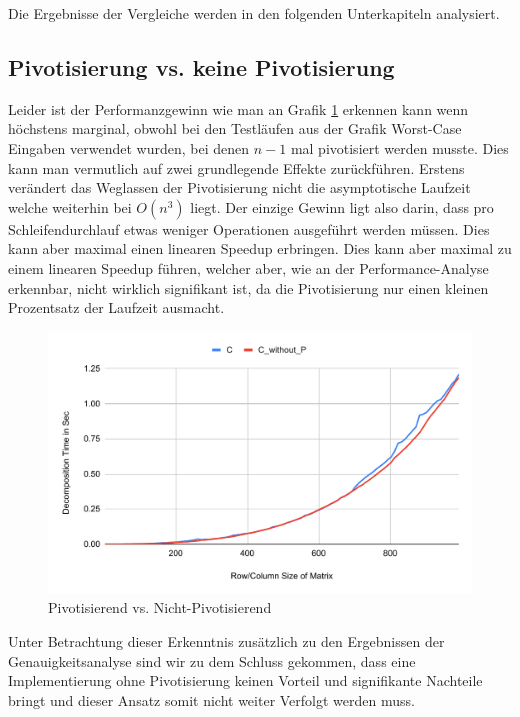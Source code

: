 \documentclass[course=erap]{aspdoc}
\begin{document}
Die Ergebnisse der Vergleiche werden in den folgenden Unterkapiteln analysiert. \\


\subsection{Pivotisierung vs. keine Pivotisierung}
Leider ist der Performanzgewinn wie man an Grafik \ref{PvsNP} erkennen kann wenn höchstens marginal, obwohl bei den 
Testläufen aus der Grafik Worst-Case Eingaben verwendet wurden, bei denen $n-1$ mal pivotisiert werden musste.
Dies kann man vermutlich auf zwei grundlegende Effekte zurückführen. Erstens verändert das Weglassen der Pivotisierung 
nicht die asymptotische Laufzeit welche weiterhin bei $O(n^3)$ liegt. Der einzige Gewinn ligt also darin, dass pro 
Schleifendurchlauf etwas weniger Operationen ausgeführt werden müssen. Dies kann aber maximal einen linearen Speedup 
erbringen. Dies kann aber maximal zu einem linearen Speedup führen, welcher aber, wie an der Performance-Analyse 
erkennbar, nicht wirklich signifikant ist, da die Pivotisierung nur einen kleinen Prozentsatz der Laufzeit ausmacht. 
  \begin{figure}[H]
  \begin{center}
  \caption{Pivotisierend vs. Nicht-Pivotisierend} 
  \label{PvsNP}
  \includegraphics[width = 0.8\linewidth]{PvsNP.pdf}
  \end{center}
  \end{figure}
Unter Betrachtung dieser Erkenntnis zusätzlich zu den Ergebnissen der Genauigkeitsanalyse sind wir zu dem Schluss gekommen, dass eine Implementierung ohne Pivotisierung keinen Vorteil und signifikante Nachteile bringt und dieser
Ansatz somit nicht weiter Verfolgt werden muss.
\end{document}
